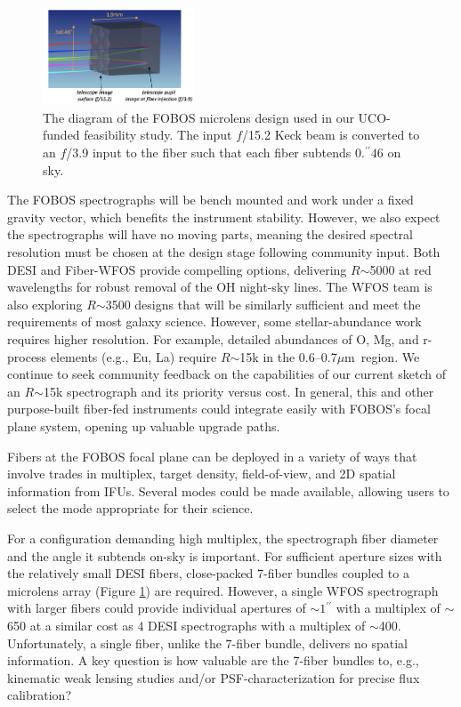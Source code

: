 \documentclass[11pt,letterpaper]{article}
\newcommand\arcsec{\mbox{$^{\prime\prime}$}}%
\newcommand\farcs{\mbox{$.\!\!^{\prime\prime}$}}%
\newcommand\micron{\mbox{$\mu$m}}%
\begin{document}
\begin{figure}\small
\includegraphics[width=0.4\textwidth]{./figs/fobos_microlens.png}
\caption{\label{fig:microlens} The diagram of the FOBOS microlens design
used in our UCO-funded feasibility study.  The input $f$/15.2 Keck beam
is converted to an $f$/3.9 input to the fiber such that each fiber
subtends $0\farcs46$ on sky.} \end{figure}
%
  The FOBOS spectrographs will be
bench mounted and work under a fixed gravity vector, which benefits the
instrument stability.  However, we also expect the spectrographs will
have no moving parts, meaning the desired spectral resolution must be
chosen at the design stage following community input.  Both DESI and
Fiber-WFOS provide compelling options, delivering $R$$\sim$5000 at red
wavelengths for robust removal of the OH night-sky lines.  The WFOS team
is also exploring $R$$\sim$3500 designs that will be similarly
sufficient and meet the requirements of most galaxy science.  However,
some stellar-abundance work requires higher resolution.  For example,
detailed abundances of O, Mg, and r-process elements (e.g., Eu, La)
require $R$$\sim$15k in the 0.6--0.7\micron\ region.  We continue to
seek community feedback on the capabilities of our current sketch of an
$R$$\sim$15k spectrograph and its priority versus cost.  In general,
this and other purpose-built fiber-fed instruments could integrate
easily with FOBOS's focal plane system, opening up valuable upgrade
paths.

  Fibers at the FOBOS
focal plane can be deployed in a variety of ways that involve trades in
multiplex, target density, field-of-view, and 2D
spatial information from IFUs.  Several modes could be made available,
allowing users to select the mode appropriate for their science.

For a configuration demanding high multiplex, the spectrograph fiber
diameter and the angle it subtends on-sky is important.  For sufficient
aperture sizes with the relatively small DESI fibers, close-packed
7-fiber bundles coupled to a microlens array (Figure
\ref{fig:microlens}) are required.  However, a single WFOS spectrograph
with larger fibers could provide individual apertures of
$\sim$$1\arcsec$ with a multiplex of $\sim$650 at a similar cost as 4
DESI spectrographs with a multiplex of $\sim$400.  Unfortunately, a
single fiber, unlike the 7-fiber bundle, delivers no spatial
information.  A key question is how valuable are the 7-fiber bundles to,
e.g., kinematic weak lensing studies and/or PSF-characterization for
precise flux calibration?  
\end{document}
